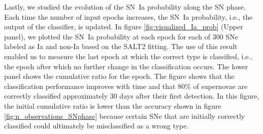 \documentclass[useamsfonts]{pasj01}
\begin{document}
Lastly, we studied the evolution of the SN~Ia probability along the SN phase.
Each time the number of input epochs increases, the SN~Ia probability, i.e., the output of the classifier, is updated.
In figure \ref{fig:visualized_Ia_prob} (Upper panel), we plotted the SN~Ia probability at each epoch for each of 300 SNe labeled as Ia and non-Ia based on the SALT2 fitting. The use of this result enabled us to measure the last epoch at which the correct type is classified, i.e., the epoch after which no further change in the classification occurs. The lower panel shows the cumulative ratio for the epoch. The figure shows that the classification performance improves with time and that 80\% of supernovae are correctly classified approximately 30 days after their first detection. In this figure, the initial cumulative ratio is lower than the accuracy shown in figure \ref{fig:n_observations_SNphase} because certain SNe that are initially correctly classified could ultimately be misclassified as a wrong type.
\end{document}
